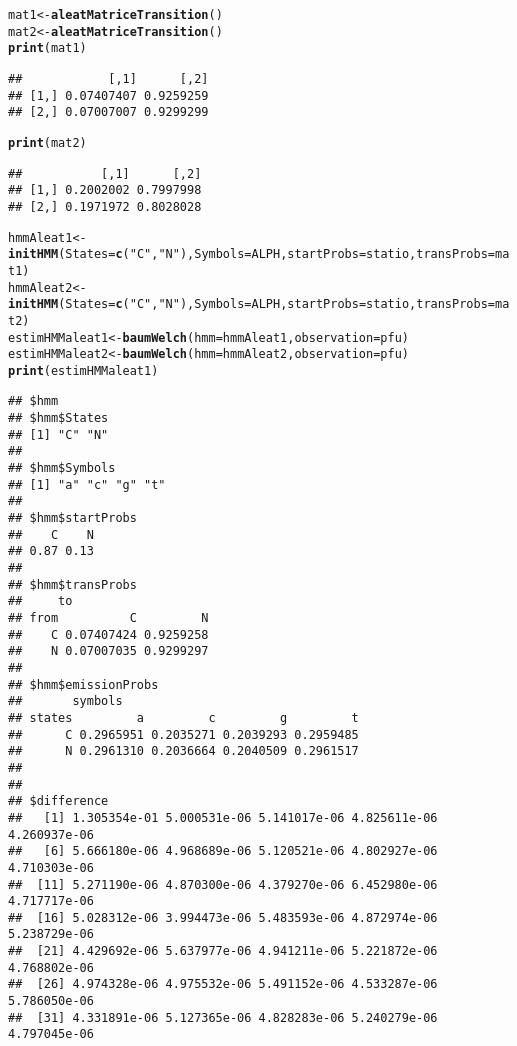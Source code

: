 \documentclass{article}
\makeatletter
\newcommand{\hlstr}[1]{\textcolor[rgb]{0.192,0.494,0.8}{#1}}%
\newcommand{\hlstd}[1]{\textcolor[rgb]{0.345,0.345,0.345}{#1}}%
\newcommand{\hlkwb}[1]{\textcolor[rgb]{0.69,0.353,0.396}{#1}}%
\newcommand{\hlkwc}[1]{\textcolor[rgb]{0.333,0.667,0.333}{#1}}%
\newcommand{\hlkwd}[1]{\textcolor[rgb]{0.737,0.353,0.396}{\textbf{#1}}}%
\newenvironment{kframe}{%
 \def\at@end@of@kframe{}%
 \ifinner\ifhmode%
  \def\at@end@of@kframe{\end{minipage}}%
  \begin{minipage}{\columnwidth}%
 \fi\fi%
 \def\FrameCommand##1{\hskip\@totalleftmargin \hskip-\fboxsep
 \colorbox{shadecolor}{##1}\hskip-\fboxsep
     \hskip-\linewidth \hskip-\@totalleftmargin \hskip\columnwidth}%
 \MakeFramed {\advance\hsize-\width
   \@totalleftmargin\z@ \linewidth\hsize
   \@setminipage}}%
 {\par\unskip\endMakeFramed%
 \at@end@of@kframe}
\newenvironment{knitrout}{}{} %
\makeatother
\begin{document}
\begin{knitrout}
\begin{kframe}
\begin{alltt}
\hlstd{mat1}\hlkwb{<-}\hlkwd{aleatMatriceTransition}\hlstd{()}
\hlstd{mat2}\hlkwb{<-}\hlkwd{aleatMatriceTransition}\hlstd{()}
\hlkwd{print}\hlstd{(mat1)}
\end{alltt}
\begin{verbatim}
##            [,1]      [,2]
## [1,] 0.07407407 0.9259259
## [2,] 0.07007007 0.9299299
\end{verbatim}
\begin{alltt}
\hlkwd{print}\hlstd{(mat2)}
\end{alltt}
\begin{verbatim}
##           [,1]      [,2]
## [1,] 0.2002002 0.7997998
## [2,] 0.1971972 0.8028028
\end{verbatim}
\begin{alltt}
\hlstd{hmmAleat1}\hlkwb{<-}\hlkwd{initHMM}\hlstd{(}\hlkwc{States} \hlstd{=} \hlkwd{c}\hlstd{(}\hlstr{"C"}\hlstd{,}\hlstr{"N"}\hlstd{),} \hlkwc{Symbols} \hlstd{= ALPH,}\hlkwc{startProbs} \hlstd{= statio,} \hlkwc{transProbs} \hlstd{= mat1)}
\hlstd{hmmAleat2}\hlkwb{<-}\hlkwd{initHMM}\hlstd{(}\hlkwc{States} \hlstd{=} \hlkwd{c}\hlstd{(}\hlstr{"C"}\hlstd{,}\hlstr{"N"}\hlstd{),} \hlkwc{Symbols} \hlstd{= ALPH,}\hlkwc{startProbs} \hlstd{= statio,} \hlkwc{transProbs} \hlstd{= mat2)}
\hlstd{estimHMMaleat1}\hlkwb{<-}\hlkwd{baumWelch}\hlstd{(}\hlkwc{hmm} \hlstd{= hmmAleat1,}\hlkwc{observation} \hlstd{= pfu)}
\hlstd{estimHMMaleat2}\hlkwb{<-}\hlkwd{baumWelch}\hlstd{(}\hlkwc{hmm} \hlstd{= hmmAleat2,}\hlkwc{observation} \hlstd{= pfu)}
\hlkwd{print}\hlstd{(estimHMMaleat1)}
\end{alltt}
\begin{verbatim}
## $hmm
## $hmm$States
## [1] "C" "N"
## 
## $hmm$Symbols
## [1] "a" "c" "g" "t"
## 
## $hmm$startProbs
##    C    N 
## 0.87 0.13 
## 
## $hmm$transProbs
##     to
## from          C         N
##    C 0.07407424 0.9259258
##    N 0.07007035 0.9299297
## 
## $hmm$emissionProbs
##       symbols
## states         a         c         g         t
##      C 0.2965951 0.2035271 0.2039293 0.2959485
##      N 0.2961310 0.2036664 0.2040509 0.2961517
## 
## 
## $difference
##   [1] 1.305354e-01 5.000531e-06 5.141017e-06 4.825611e-06 4.260937e-06
##   [6] 5.666180e-06 4.968689e-06 5.120521e-06 4.802927e-06 4.710303e-06
##  [11] 5.271190e-06 4.870300e-06 4.379270e-06 6.452980e-06 4.717717e-06
##  [16] 5.028312e-06 3.994473e-06 5.483593e-06 4.872974e-06 5.238729e-06
##  [21] 4.429692e-06 5.637977e-06 4.941211e-06 5.221872e-06 4.768802e-06
##  [26] 4.974328e-06 4.975532e-06 5.491152e-06 4.533287e-06 5.786050e-06
##  [31] 4.331891e-06 5.127365e-06 4.828283e-06 5.240279e-06 4.797045e-06

\end{verbatim}
\end{kframe}
\end{knitrout}
\end{document}
